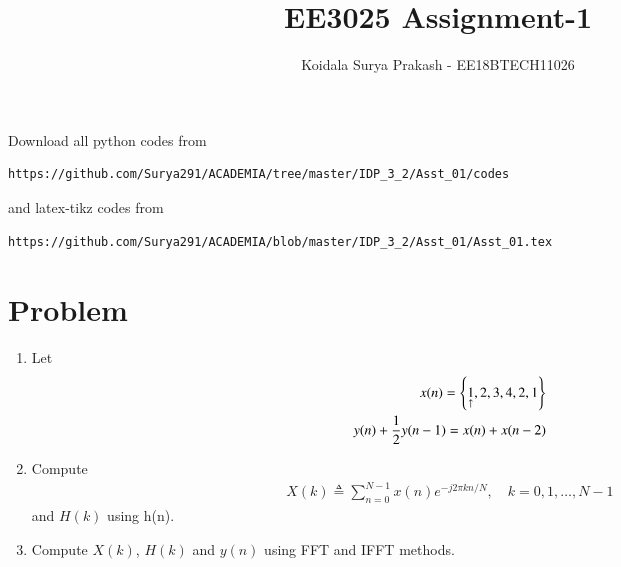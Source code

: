 \documentclass[journal,12pt,twocolumn]{IEEEtran}
\renewcommand\thesection{\arabic{section}}
\begin{document}
     \def\rightbox#1{\makebox[0in][r]{#1}}
     \def\centbox#1{\makebox[0in]{#1}}
     \def\topbox#1{\raisebox{-\baselineskip}[0in][0in]{#1}}
     \def\midbox#1{\raisebox{-0.5\baselineskip}[0in][0in]{#1}}
\vspace{3cm}
\title{EE3025 Assignment-1}
\author{Koidala Surya Prakash - EE18BTECH11026}
\maketitle
\newpage
\bigskip
\renewcommand{\thefigure}{\theenumi}
\renewcommand{\thetable}{\theenumi}
Download all python codes from 
\begin{lstlisting}
https://github.com/Surya291/ACADEMIA/tree/master/IDP_3_2/Asst_01/codes

\end{lstlisting}
%
and latex-tikz codes from 
%
\begin{lstlisting}
https://github.com/Surya291/ACADEMIA/blob/master/IDP_3_2/Asst_01/Asst_01.tex
\end{lstlisting}


\section{Problem}
\begin{enumerate}[label=\thesection.\arabic*.,ref=\thesection.\theenumi]
    
    \item Let
    \begin{align}
        x(n) = \left\{\underset{\uparrow}{1},2,3,4,2,1\right\}
         \label{eq:equation0}\\
        y(n) + \frac{1}{2}y(n-1) = x(n) + x(n-2)	
        \label{eq:equation1}
    \end{align}
    
    \item Compute 
    \begin{align}
        X(k) \triangleq \sum_{n=0}^{N-1} x(n) e^{-j 2 \pi k n / N}, \quad k=0,1, \ldots, N-1
    \end{align}
    and $H(k)$ using h(n).
    
    \item Compute $X(k)$, $H(k)$ and $y(n)$ using FFT and IFFT methods.
\end{enumerate}
\end{document}
